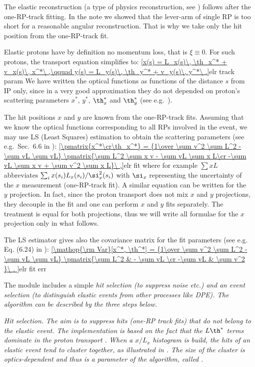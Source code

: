 The elastic reconstruction (a type of physics reconstruction, see ) follows after the one-RP-track fitting. In the note  we showed that the lever-arm of single RP is too short for a reasonable angular reconstruction. That is why we take only the hit position from the one-RP-track fit.

Elastic protons have by definition no momentum loss, that is $\xi \equiv 0$. For such protons, the transport equation  simplifies to:
\eqref{x(s) = L_x(s)\, \th_x^* + v_x(s)\, x^*\ ,\qquad y(s) = L_y(s)\, \th_y^* + v_y(s)\, y^*\ .}{elr track param}
We have written the optical functions as functions of the distance $s$ from IP only, since in a very good approximation they do not depended on proton's scattering parameters $x^*$, $y^*$, $\th^*_x$ and $\th^*_y$ (see e.g.~).

The hit positions $x$ and $y$ are known from the one-RP-track fits. Assuming that we know the optical functions corresponding to all RPs involved in the event, we may use LS (Least Squares) estimation to obtain the scattering parameters (see e.g.~Sec.~6.6 in ):
\eqref{\pmatrix{x^*\cr\th_x^*} = {1\over \sum v^2 \sum L^2 - \sum vL \sum vL} \pmatrix{\sum L^2 \sum x v - \sum vL \sum x L\cr -\sum vL \sum x v + \sum v^2 \sum x L}\ ,}{elr fit}
where for example $\sum x L$ abbreviates $\sum_{i} x(s_i) L_x(s_i) / \si_x^2(s_i)$ with $\si_x$ representing the uncertainty of the $x$ measurement (one-RP-track fit). A similar equation can be written for the $y$ projection. In fact, since the proton transport  does not mix $x$ and $y$ projections, they decouple in the fit and one can perform $x$ and $y$ fits separately. The treatment is equal for both projections, thus we will write all formulae for the $x$ projection only in what follows.

The LS estimator gives also the covariance matrix for the fit parameters (see e.g. Eq. (6.24) in ):
\eqref{\mathop{\rm Var}[x^*, \th^*] = {1\over \sum v^2 \sum L^2 - \sum vL \sum vL} \pmatrix{\sum L^2 & - \sum vL \cr -\sum vL & \sum v^2 }\ .
}{elr fit err}

The module includes a simple \em{hit selection} (to suppress noise etc.) and an \em{event selection} (to distinguish elastic events from other processes like DPE). The algorithm can be described by the three steps below.

\bitm
\itm \em{Hit selection}. The aim is to suppress hits (one-RP track fits) that do not belong to the elastic event. The implementation is based on the fact that the $L\th^*$ terms dominate in the proton transport 
. When a $x/L_x$ histogram is build, the hits of an elastic event tend to cluster together, as illustrated in . The size of the cluster is optics-dependent and thus is a parameter of the algorithm, called .

